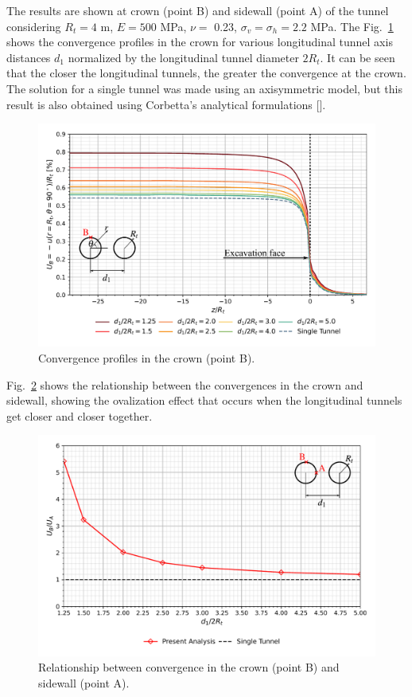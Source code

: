 \documentclass[a4paper,fleqn]{cas-sc}
\begin{document}
The results are shown at crown (point B) and sidewall (point A) of the tunnel considering  $R_t = 4$ m, $E = 500$ MPa, $\nu =$ 0.23, $\sigma_v = \sigma_h = 2.2$ MPa. The Fig.~\ref{Convergence Profiles in B} shows the convergence profiles in the crown for various longitudinal tunnel axis distances $d_1$ normalized by the longitudinal tunnel diameter $2R_t$. It can be seen that the closer the longitudinal tunnels, the greater the convergence at the crown. The solution for a single tunnel was made using an axisymmetric model, but this result is also obtained using Corbetta's analytical formulations [].

\begin{figure}[h!]
	\centering
	\includegraphics[scale=0.7]{Convergence Profiles in B.pdf}
	\caption{Convergence profiles in the crown (point B).}
	\label{Convergence Profiles in B}
\end{figure}
\FloatBarrier

Fig.~\ref{Relationship between convergence in B and A} shows the relationship between the convergences in the crown and sidewall, showing the ovalization effect that occurs when the longitudinal tunnels get closer and closer together.

\begin{figure}[h!]
	\centering
	\includegraphics[scale=0.7]{Relationship between Convergence in B and A.pdf}
	\caption{Relationship between convergence in the crown (point B) and sidewall (point A).}
	\label{Relationship between convergence in B and A}
\end{figure}
\FloatBarrier
\end{document}
